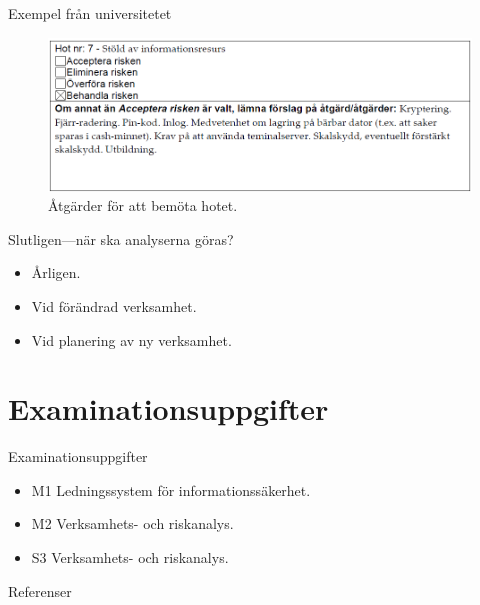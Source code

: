 \documentclass{beamer}
\begin{document}
\begin{frame}{Exempel från universitetet}
  \begin{figure}
    \includegraphics[width=\textwidth]{miun-atgard.png}
    \caption{Åtgärder för att bemöta hotet.}
  \end{figure}
\end{frame}

\begin{frame}{Slutligen---när ska analyserna göras?}
  \begin{itemize}
    \item Årligen.
    \item Vid förändrad verksamhet.
    \item Vid planering av ny verksamhet.
  \end{itemize}
\end{frame}


\section[Uppgifter]{Examinationsuppgifter}

\begin{frame}{Examinationsuppgifter}
  \begin{itemize}
    \item M1 Ledningssystem för informationssäkerhet.
    \item M2 Verksamhets- och riskanalys.
    \item S3 Verksamhets- och riskanalys.
  \end{itemize}
\end{frame}



\begin{frame}[allowframebreaks]{Referenser}
	\small
  \printbibliography{}
\end{frame}
\end{document}
